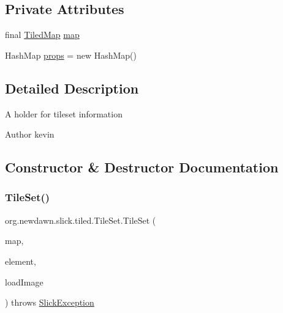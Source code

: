 \subsection*{Private Attributes}
\begin{DoxyCompactItemize}
\item 
final \mbox{\hyperlink{classorg_1_1newdawn_1_1slick_1_1tiled_1_1_tiled_map}{Tiled\+Map}} \mbox{\hyperlink{classorg_1_1newdawn_1_1slick_1_1tiled_1_1_tile_set_a6d8213553283cc2970748811ec170644}{map}}
\item 
Hash\+Map \mbox{\hyperlink{classorg_1_1newdawn_1_1slick_1_1tiled_1_1_tile_set_ada3988681e613aa9884649c19509d29c}{props}} = new Hash\+Map()
\end{DoxyCompactItemize}


\subsection{Detailed Description}
A holder for tileset information

\begin{DoxyAuthor}{Author}
kevin 
\end{DoxyAuthor}


\subsection{Constructor \& Destructor Documentation}
\mbox{\label{classorg_1_1newdawn_1_1slick_1_1tiled_1_1_tile_set_a41d4a7cf74a94b435ad4e5c92fa9ba9b}} 
\subsubsection{\texorpdfstring{Tile\+Set()}{TileSet()}}
{\footnotesize\ttfamily org.\+newdawn.\+slick.\+tiled.\+Tile\+Set.\+Tile\+Set (\begin{DoxyParamCaption}\item[{\mbox{\hyperlink{classorg_1_1newdawn_1_1slick_1_1tiled_1_1_tiled_map}{Tiled\+Map}}}]{map,  }\item[{Element}]{element,  }\item[{boolean}]{load\+Image }\end{DoxyParamCaption}) throws \mbox{\hyperlink{classorg_1_1newdawn_1_1slick_1_1_slick_exception}{Slick\+Exception}}\hspace{0.3cm}{\ttfamily [inline]}}

